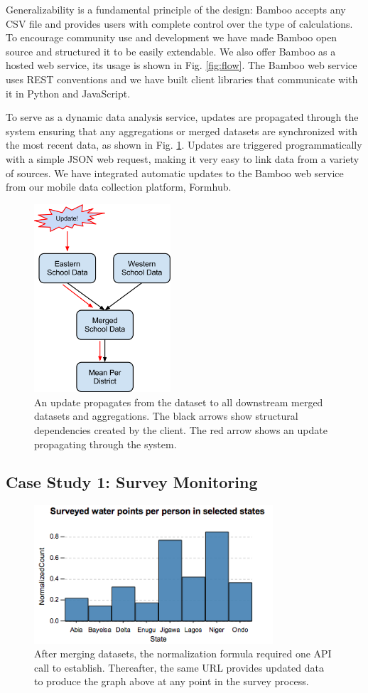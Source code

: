 \documentclass{acm_proc_article-sp}
\begin{document}
Generalizability is a fundamental principle of the design: Bamboo accepts any CSV file and provides users with complete control over the type of calculations.  To encourage community use and development we have made Bamboo open source and structured it to be easily extendable.  We also offer Bamboo as a hosted web service, its usage is shown in Fig. \ref{fig:flow}.  The Bamboo web service uses REST conventions and we have built client libraries that communicate with it in Python and JavaScript.

To serve as a dynamic data analysis service, updates are propagated through the system ensuring that any aggregations or merged datasets are synchronized with the most recent data, as shown in Fig. \ref{fig:updates}.  Updates are triggered programmatically with a simple JSON web request, making it very easy to link data from a variety of sources.  We have integrated automatic updates to the Bamboo web service from our mobile data collection platform, Formhub.

\begin{figure}
\centering
\includegraphics[width=2in]{figures/update_flow}
\caption{An update propagates from the dataset to all downstream merged datasets and aggregations.  The black arrows show structural dependencies created by the client.  The red arrow shows an update propagating through the system.}
\label{fig:updates}
\end{figure}

\subsection{Case Study 1: Survey Monitoring}

\begin{figure}
\centering
\includegraphics[width=3.5in]{figures/summary.png}
\caption{After merging datasets, the normalization formula required one API call to establish. Thereafter, the same URL provides updated data to produce the graph above at any point in the survey process.}
\label{fig:summary}
\end{figure}
\end{document}
